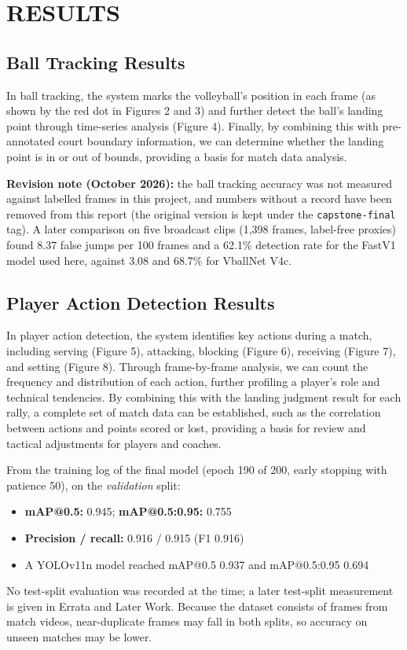 \documentclass[journal]{IEEEtran}
\begin{document}
\section{RESULTS}

\subsection{Ball Tracking Results}
In ball tracking, the system marks the volleyball's position in each frame (as shown by the red dot in Figures 2 and 3) and further detect the ball's landing point through time-series analysis (Figure 4). Finally, by combining this with pre-annotated court boundary information, we can determine whether the landing point is in or out of bounds, providing a basis for match data analysis.

\textbf{Revision note (October 2026):} the ball tracking accuracy was not measured against labelled frames in this project, and numbers without a record have been removed from this report (the original version is kept under the \texttt{capstone-final} tag). A later comparison on five broadcast clips (1,398 frames, label-free proxies) found 8.37 false jumps per 100 frames and a 62.1\% detection rate for the FastV1 model used here, against 3.08 and 68.7\% for VballNet V4c.

\subsection{Player Action Detection Results}
In player action detection, the system identifies key actions during a match, including serving (Figure 5), attacking, blocking (Figure 6), receiving (Figure 7), and setting (Figure 8). Through frame-by-frame analysis, we can count the frequency and distribution of each action, further profiling a player's role and technical tendencies. By combining this with the landing judgment result for each rally, a complete set of match data can be established, such as the correlation between actions and points scored or lost, providing a basis for review and tactical adjustments for players and coaches.

From the training log of the final model (epoch 190 of 200, early stopping with patience 50), on the \emph{validation} split:
\begin{itemize}
\item \textbf{mAP@0.5:} 0.945; \textbf{mAP@0.5:0.95:} 0.755
\item \textbf{Precision / recall:} 0.916 / 0.915 (F1 0.916)
\item A YOLOv11n model reached mAP@0.5 0.937 and mAP@0.5:0.95 0.694
\end{itemize}
No test-split evaluation was recorded at the time; a later test-split measurement is given in Errata and Later Work. Because the dataset consists of frames from match videos, near-duplicate frames may fall in both splits, so accuracy on unseen matches may be lower.
\end{document}
